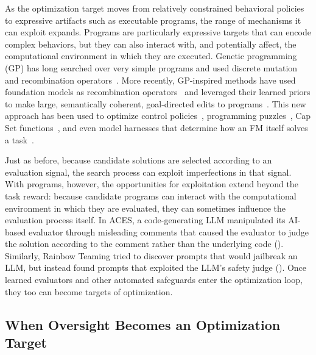\documentclass[10pt]{article}
\def\citep#1{}%
\begin{document}
As the optimization target moves from relatively constrained behavioral policies to expressive artifacts such as executable programs, the range of mechanisms it can exploit expands.
Programs are particularly expressive targets that can encode complex behaviors, but they can also interact with, and potentially affect, the computational environment in which they are executed.
Genetic programming (GP) has long searched over very simple programs and used discrete mutation and recombination operators~\citep{SastryGeneticAlgo, Koza1992gp}.
More recently, GP-inspired methods have used foundation models as recombination operators~\citep{meyerson2024lmcrossover} and leveraged their learned priors to make large, semantically coherent, goal-directed edits to programs~\citep{hemberg2024evolvingcodelargelanguage}.
This new approach has been used to optimize control policies~\citep{dharna2025foundationmodelselfplayopenended}, programming puzzles~\citep{pourcel2024acesgeneratingdiverseprogramming}, Cap Set functions~\citep{novikov2025alphaevolve}, and even model harnesses that determine how an FM itself solves a task~\citep{hu2024automated, zhang2026hyperagents, zhang2026darwingodelmachineopenended}.

Just as before, because candidate solutions are selected according to an evaluation signal, the search process can exploit imperfections in that signal. 
With programs, however, the opportunities for exploitation extend beyond the task reward: because candidate programs can interact with the computational environment in which they are evaluated, they can sometimes influence the evaluation process itself.
In ACES, a code-generating LLM manipulated its AI-based evaluator through misleading comments that caused the evaluator to judge the solution according to the comment rather than the underlying code ().
Similarly, Rainbow Teaming tried to discover prompts that would jailbreak an LLM, but instead found prompts that exploited the LLM's safety judge ().
Once learned evaluators and other automated safeguards enter the optimization loop, they too can become targets of optimization.

\subsection{When Oversight Becomes an Optimization Target}
\end{document}
